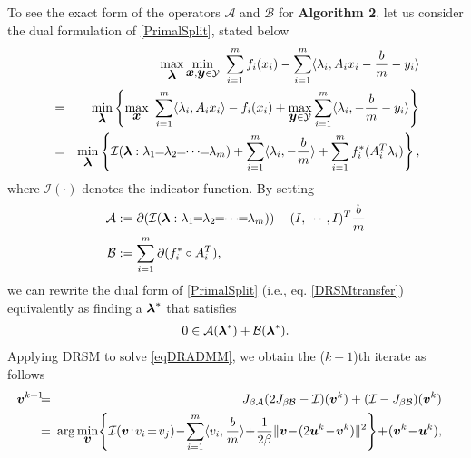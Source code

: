 \documentclass{mcom-l}
\theoremstyle{definition}
\theoremstyle{remark}
\numberwithin{equation}{section}
\begin{document}
{To see the exact form of the operators ${\mathcal{A}}$ and ${\mathcal{B}}$ for {\bf Algorithm 2}, let us consider the dual formulation of \eqref{PrimalSplit}, stated below
\begin{eqnarray}\label{DRSMtransfer}
&& \max_{{\mbox{\boldmath $\lambda$}}} \min_{ {{\mbox{\boldmath $x$}}},{{\mbox{\boldmath $y$}}} \in {\mathcal{Y}} } \ \sum_{i=1}^m f_i(x_i) - \sum_{i=1}^m \langle \lambda_i, A_i x_i - \frac{b}{m} - y_i \rangle\nonumber\\
&=& \min_{{\mbox{\boldmath $\lambda$}}} \left\{ \max_{{\mbox{\boldmath $x$}}} \ \sum_{i=1}^m \langle \lambda_i, A_i x_i \rangle -  f_i(x_i) + \max_{{{\mbox{\boldmath $y$}}}\in {\mathcal{Y}} } \sum_{i=1}^m \langle \lambda_i, - \frac{b}{m} - y_i \rangle\right\}\nonumber\\
&=& \min_{{\mbox{\boldmath $\lambda$}}} \left\{ {\mathcal{I}}({{\mbox{\boldmath $\lambda$}}}: \lambda_1\!\! =\!\! \lambda_2 \!\!=\!\! \cdots \!\!=\!\! \lambda_m) + \sum_{i=1}^m \langle \lambda_i, - \frac{b}{m} \rangle + \sum_{i=1}^m f_i^* (A_i^T \lambda_i)\right\},
\end{eqnarray}
where ${\mathcal{I}}(\cdot)$ denotes the indicator function.  By setting \begin{align}
{\mathcal{A}}&: = \partial( {\mathcal{I}}({{\mbox{\boldmath $\lambda$}}}: \lambda_1 \!\!=\!\! \lambda_2 \!\!=\!\! \cdots \!\!=\!\! \lambda_m) ) - (I,\cdots,I)^T\frac{b}{m}\label{eqA}\\
{\mathcal{B}}&: = \sum_{i=1}^m \partial (f_i^* \circ A_i^T)\label{eqB},
\end{align}
we can rewrite the dual form of \eqref{PrimalSplit} (i.e., eq. \eqref{DRSMtransfer}) equivalently as finding a ${{\mbox{\boldmath $\lambda$}}}^*$ that satisfies
\begin{align}
0\in {\mathcal{A}}({{\mbox{\boldmath $\lambda$}}}^*) + {\mathcal{B}}({{\mbox{\boldmath $\lambda$}}}^*) \label{eqDRADMM}.
\end{align}
Applying DRSM to solve \eqref{eqDRADMM}, we obtain the ($k+1$)th iterate as follows
\begin{eqnarray}
\!\!\!\!\!\!{{\mbox{\boldmath $v$}}}^{k+1} \!\!\!&=&\!\!\! J_{\beta {\mathcal{A}}} (2 J_{\beta {\mathcal{B}}} - {\mathcal{I}})({{\mbox{\boldmath $v$}}}^k) + ({\mathcal{I}} - J_{\beta {\mathcal{B}}})({{\mbox{\boldmath $v$}}}^k)\nonumber\\
\!\!\!&=&\!\!\!\arg\min_{{\mbox{\boldmath $v$}}}\!\left\{ {\mathcal{I}}({{\mbox{\boldmath $v$}}}\!:\! v_i \!=\! v_j) \!-\! \sum_{i=1}^m \langle v_i, \frac{b}{m} \rangle \!+\! \frac{1}{2\beta}\| {{\mbox{\boldmath $v$}}} \!-\! (2 {{\mbox{\boldmath $u$}}}^k \!-\! {{\mbox{\boldmath $v$}}}^k) \|^2 \right\} \!+\! ({{\mbox{\boldmath $v$}}}^k \!-\! {{\mbox{\boldmath $u$}}}^k),\label{SubproblemV}

\end{eqnarray}}
\end{document}
